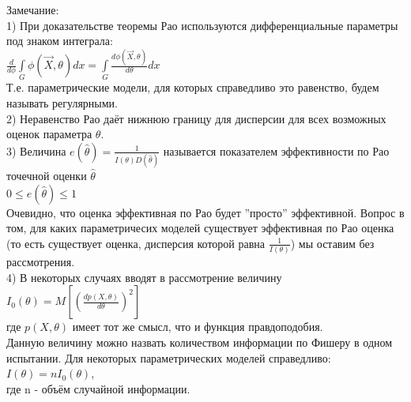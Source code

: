 Замечание:\\
1) При доказательстве теоремы Рао используются дифференциальные параметры под знаком интеграла:\\
$\frac{d}{d\phi}\int\limits_{G}\phi(\overrightarrow{X}, \theta)dx = \int\limits_{G} \frac{d\phi(\overrightarrow{X}, \theta)}{d\theta}dx$\\
Т.е. параметрические модели, для которых справедливо это равенство, будем называть регулярными. \\
2) Неравенство Рао даёт нижнюю границу для дисперсии для всех возможных оценок параметра $\theta$.\\
3) Величина $e(\hat{\theta}) = \frac{1}{I(\theta)D(\hat{\theta})}$ называется показателем эффективности по Рао точечной оценки $\hat{\theta}$\\
$0 \leqslant e(\hat{\theta}) \leqslant 1$\\
Очевидно, что оценка эффективная по Рао будет ''просто'' эффективной. Вопрос в том, для каких параметричесих моделей существует эффективная по Рао оценка (то есть существует оценка, дисперсия которой равна $\frac{1}{I(\theta)}$) мы оставим без рассмотрения.\\
4) В некоторых случаях вводят в рассмотрение величину $I_{0} (\theta) = M[(\frac{dp(X, \theta)}{d\theta})^{2}]$\\
где $p(X, \theta)$ имеет тот же смысл, что и функция правдоподобия.\\
Данную величину можно назвать количеством информации по Фишеру в одном испытании. Для некоторых параметрических моделей справедливо:\\
$I(\theta) = nI_{0}(\theta)$,\\
где n - объём случайной информации.\\

